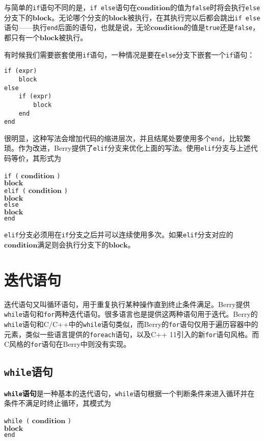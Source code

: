 与简单的\texttt{if}语句不同的是，\texttt{if else}语句在$\bm{condition}$的值为\texttt{false}时将会执行\texttt{else}分支下的$\bm{block}$。无论哪个分支的$\bm{block}$被执行，在其执行完以后都会跳出\texttt{if else}语句——执行\texttt{end}后面的语句，也就是说，无论$\bm{condition}$的值是\texttt{true}还是\texttt{false}，都只有一个$\bm{block}$被执行。

有时候我们需要嵌套使用\texttt{if}语句，一种情况是要在\texttt{else}分支下嵌套一个\texttt{if}语句：
\begin{lstlisting}[language=berry, numbers=none]
if (expr)
    block
else
    if (expr)
        block
    end
end
\end{lstlisting}
很明显，这种写法会增加代码的缩进层次，并且结尾处要使用多个\texttt{end}，比较繁琐。作为改进，Berry提供了\texttt{elif}分支来优化上面的写法。使用\texttt{elif}分支与上述代码等价，其形式为
\begin{algorithm}
    \texttt{if (} $\bm{condition}$ \texttt{)} \\
        \qquad $\bm{block}$ \\
    \texttt{elif (} $\bm{condition}$ \texttt{)} \\
        \qquad $\bm{block}$ \\
    \texttt{else} \\
    \qquad $\bm{block}$ \\
    \texttt{end}
\end{algorithm}

\texttt{elif}分支必须用在\texttt{if}分支之后并可以连续使用多次。如果\texttt{elif}分支对应的$\bm{condition}$满足则会执行分支下的$\bm{block}$。

\section{迭代语句}

迭代语句又叫循环语句，用于重复执行某种操作直到终止条件满足。Berry提供\texttt{while}语句和\texttt{for}两种迭代语句。很多语言也是提供这两种语句用于迭代。Berry的\texttt{while}语句和C/C++中的\texttt{while}语句类似，而Berry的\texttt{for}语句仅用于遍历容器中的元素，类似一些语言提供的\texttt{foreach}语句，以及C++ 11引入的新\texttt{for}语句风格。而C风格的\texttt{for}语句在Berry中则没有实现。

\subsection{\texttt{while}语句}

\textbf{\texttt{while}语句}是一种基本的迭代语句，\texttt{while}语句根据一个判断条件来进入循环并在条件不满足时终止循环，其模式为
\begin{algorithm}
    \texttt{while (} $\bm{condition}$ \texttt{)} \\
        \qquad $\bm{block}$ \\
    \texttt{end}
\end{algorithm}

